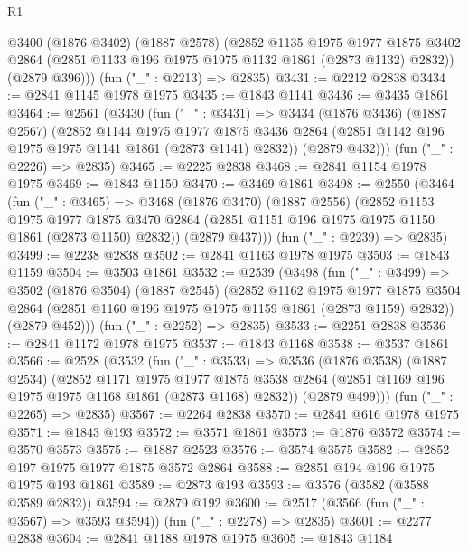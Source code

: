 \begin{lexlean}{R1}
\begin{coremodule}
      @3400
        (@1876 @3402)
        (@1887 @2578)
        (@2852
          @1135
          @1975
          @1977
          @1875
          @3402
          @2864
          (@2851 @1133 @196 @1975 @1975 @1132 @1861 (@2873 @1132) @2832))
        (@2879 @396)))
    (fun ("_" : @2213) => @2835)
@3431 := @2212 @2838
@3434 := @2841 @1145 @1978 @1975
@3435 := @1843 @1141
@3436 := @3435 @1861
@3464 := @2561
    (@3430
      (fun ("_" : @3431) =>
      @3434
        (@1876 @3436)
        (@1887 @2567)
        (@2852
          @1144
          @1975
          @1977
          @1875
          @3436
          @2864
          (@2851 @1142 @196 @1975 @1975 @1141 @1861 (@2873 @1141) @2832))
        (@2879 @432)))
    (fun ("_" : @2226) => @2835)
@3465 := @2225 @2838
@3468 := @2841 @1154 @1978 @1975
@3469 := @1843 @1150
@3470 := @3469 @1861
@3498 := @2550
    (@3464
      (fun ("_" : @3465) =>
      @3468
        (@1876 @3470)
        (@1887 @2556)
        (@2852
          @1153
          @1975
          @1977
          @1875
          @3470
          @2864
          (@2851 @1151 @196 @1975 @1975 @1150 @1861 (@2873 @1150) @2832))
        (@2879 @437)))
    (fun ("_" : @2239) => @2835)
@3499 := @2238 @2838
@3502 := @2841 @1163 @1978 @1975
@3503 := @1843 @1159
@3504 := @3503 @1861
@3532 := @2539
    (@3498
      (fun ("_" : @3499) =>
      @3502
        (@1876 @3504)
        (@1887 @2545)
        (@2852
          @1162
          @1975
          @1977
          @1875
          @3504
          @2864
          (@2851 @1160 @196 @1975 @1975 @1159 @1861 (@2873 @1159) @2832))
        (@2879 @452)))
    (fun ("_" : @2252) => @2835)
@3533 := @2251 @2838
@3536 := @2841 @1172 @1978 @1975
@3537 := @1843 @1168
@3538 := @3537 @1861
@3566 := @2528
    (@3532
      (fun ("_" : @3533) =>
      @3536
        (@1876 @3538)
        (@1887 @2534)
        (@2852
          @1171
          @1975
          @1977
          @1875
          @3538
          @2864
          (@2851 @1169 @196 @1975 @1975 @1168 @1861 (@2873 @1168) @2832))
        (@2879 @499)))
    (fun ("_" : @2265) => @2835)
@3567 := @2264 @2838
@3570 := @2841 @616 @1978 @1975
@3571 := @1843 @193
@3572 := @3571 @1861
@3573 := @1876 @3572
@3574 := @3570 @3573
@3575 := @1887 @2523
@3576 := @3574 @3575
@3582 := @2852 @197 @1975 @1977 @1875 @3572 @2864
@3588 := @2851 @194 @196 @1975 @1975 @193 @1861
@3589 := @2873 @193
@3593 := @3576 (@3582 (@3588 @3589 @2832))
@3594 := @2879 @192
@3600 := @2517 (@3566 (fun ("_" : @3567) => @3593 @3594)) (fun ("_" : @2278) => @2835)
@3601 := @2277 @2838
@3604 := @2841 @1188 @1978 @1975
@3605 := @1843 @1184

\end{coremodule}
\end{lexlean}
